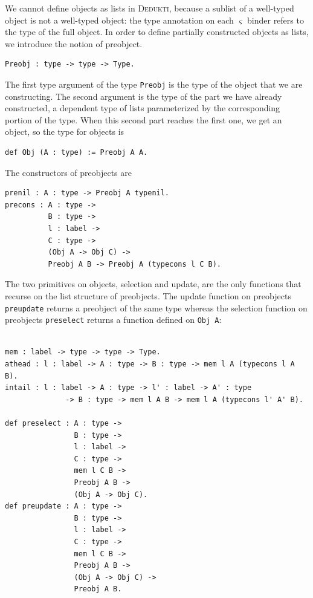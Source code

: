 \documentclass[english]{lipics}
\begin{document}
We cannot define objects as lists in \textsc{Dedukti}, because a sublist of a
well-typed object is not a well-typed object: the type annotation on
each $\varsigma$ binder refers to the type of the full object.  In
order to define partially constructed objects as lists, we introduce
the notion of preobject.

\begin{lstlisting}
Preobj : type -> type -> Type.
\end{lstlisting}

The first type argument of the type \texttt{Preobj} is the type of the
object that we are constructing. The second argument is the type of
the part we have already constructed, a dependent type
of lists parameterized by the corresponding portion of the type. When
this second part reaches the first one, we get an object, so the type
for objects is
\begin{lstlisting}
def Obj (A : type) := Preobj A A.
\end{lstlisting}

The constructors of preobjects are

\begin{lstlisting}
prenil : A : type -> Preobj A typenil.
precons : A : type ->
          B : type ->
          l : label ->
          C : type ->
          (Obj A -> Obj C) ->
          Preobj A B -> Preobj A (typecons l C B).
\end{lstlisting}

The two primitives on objects, selection and update, are the only
functions that recurse on the list structure of preobjects.  The
update function on preobjects \texttt{preupdate} returns a preobject
of the same type whereas the selection function on preobjects
\texttt{preselect} returns a function defined on \texttt{Obj A}:
\begin{lstlisting}

mem : label -> type -> type -> Type.
athead : l : label -> A : type -> B : type -> mem l A (typecons l A B).
intail : l : label -> A : type -> l' : label -> A' : type
              -> B : type -> mem l A B -> mem l A (typecons l' A' B).

def preselect : A : type ->
                B : type ->
                l : label ->
                C : type ->
                mem l C B ->
                Preobj A B ->
                (Obj A -> Obj C).
def preupdate : A : type ->
                B : type ->
                l : label ->
                C : type ->
                mem l C B ->
                Preobj A B ->
                (Obj A -> Obj C) ->
                Preobj A B.
\end{lstlisting}
\end{document}
